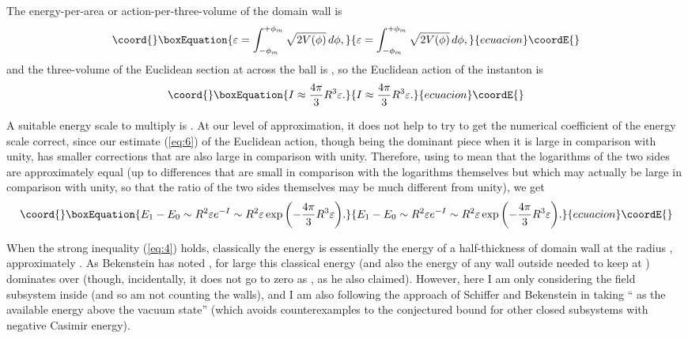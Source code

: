 \documentclass[a4paper,12pt]{article}
\begin{document}
	The energy-per-area or action-per-three-volume
of the domain wall is
 \begin{equation}\coord{}\boxEquation{
 \varepsilon=\int_{-\phi_m}^{+\phi_m}\sqrt{2V(\phi)}\,d\phi,
 \label{eq:5}
 }{
 \varepsilon=\int_{-\phi_m}^{+\phi_m}\sqrt{2V(\phi)}\,d\phi,
 }{ecuacion}\coordE{}\end{equation}
and the three-volume of the Euclidean section at
\coordHE{} across the ball \coordHE{} is \coordHE{},
so the Euclidean action of the instanton is
 \begin{equation}\coord{}\boxEquation{
 I \approx {4\pi\over 3} R^3 \varepsilon.
 \label{eq:6}
 }{
 I \approx {4\pi\over 3} R^3 \varepsilon.
 }{ecuacion}\coordE{}\end{equation}

	A suitable energy scale to multiply \coordHE{}
is \coordHE{}.  At our level of approximation,
it does not help to try to get the numerical
coefficient of the energy scale correct,
since our estimate (\ref{eq:6}) of the Euclidean action,
though being the dominant piece when it is large
in comparison with unity, has smaller corrections
that are also large in comparison with unity.
Therefore, using \myHighlight{$\sim$}\coordHE{} to mean that the logarithms
of the two sides are approximately equal
(up to differences that are small in comparison
with the logarithms themselves but which may actually
be large in comparison with unity,
so that the ratio of the two sides themselves
may be much different from unity), we get 
 \begin{equation}\coord{}\boxEquation{
 E_1-E_0 \sim R^2 \varepsilon e^{-I}
     \sim R^2 \varepsilon
        \exp{\left(-{4\pi\over 3}R^3\varepsilon\right)}.
 \label{eq:7}
 }{
 E_1-E_0 \sim R^2 \varepsilon e^{-I}
     \sim R^2 \varepsilon
        \exp{\left(-{4\pi\over 3}R^3\varepsilon\right)}.
 }{ecuacion}\coordE{}\end{equation}

	When the strong inequality (\ref{eq:4}) holds,
classically the energy \coordHE{} is essentially the energy
of a half-thickness of domain wall at the radius \coordHE{},
approximately \coordHE{}.
As Bekenstein has noted
\cite{Bek9},
for large \coordHE{} this classical energy
(and also the energy of any wall outside \coordHE{}
needed to keep \coordHE{} at \coordHE{})
dominates over \coordHE{}
(though, incidentally, it does not go
to zero as \coordHE{},
as he also claimed).
However, here I am only considering
the field subsystem inside \coordHE{}
(and so am not counting the walls),
and I am also following the approach
of Schiffer and Bekenstein
\cite{SB1}
in taking ``\coordHE{} as the available energy
above the vacuum state''
(which avoids counterexamples to
the conjectured bound for other closed
subsystems with negative Casimir energy).
\end{document}
